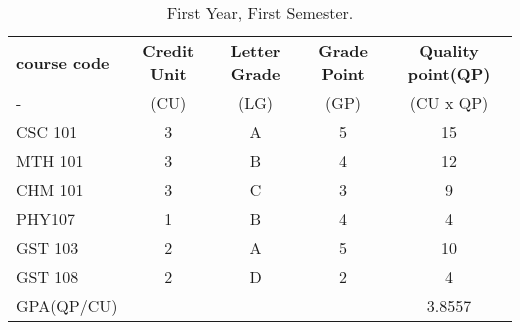 \documentclass{article}
\begin{document}
	\begin{table}
		\begin{center}
			\caption{First Year, First Semester.}
			\label{tab:Table 1}
			\begin{tabular}{|l|c|c|c|c|} %
			\hline
		\rowcolor{red!30}  \textbf{course code} & \textbf{ Credit Unit} & \textbf{Letter Grade}
				& \textbf{Grade Point} & \textbf{Quality point(QP)}\\
		\rowcolor{blue!25}
				- & (CU) & (LG) & (GP) & (CU x QP)\\
		\cellcolor{blue!15}CSC 101 & 3 & A & 5 & 15\\
	\cellcolor{blue!25}MTH 101 & 3 & B & 4 & 12\\
	\cellcolor{blue!15}CHM 101 & 3 & C & 3 & 9\\
	\cellcolor{blue!25}PHY107 & 1 & B & 4 & 4\\
	\cellcolor{blue!15}GST 103 & 2 & A & 5 & 10\\
	\cellcolor{blue!25}GST 108 & 2 
	& D & 2 & 4\\
	\hline
	\rowcolor{yellow!15}GPA(QP/CU) & & & 
	& 3.8557\\
	\hline
			\end{tabular}
		\end{center}
	\end{table}
\end{document}
